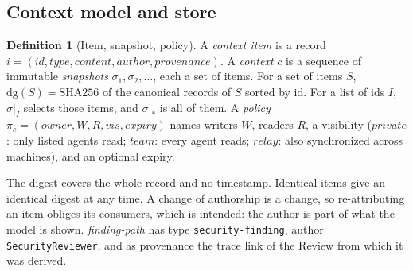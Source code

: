 \documentclass[10pt,conference]{IEEEtran}
\theoremstyle{definition}
\newtheorem{definition}{Definition}
\newcommand{\cls}[1]{\textsf{#1}}
\newcommand{\code}[1]{\texttt{#1}}
\newcommand{\dig}{\mathrm{dg}}
\begin{document}
\subsection{Context model and store}\label{sec:store}

\begin{definition}[Item, snapshot, policy]\label{def:context}
A \emph{context item} is a record $i=(\mathit{id},\mathit{type},\mathit{content},\mathit{author},
\mathit{provenance})$. A \emph{context} $c$ is a sequence of immutable \emph{snapshots}
$\sigma_1,\sigma_2,\dots$, each a set of items. For a set of items $S$,
$\dig(S)=\mathrm{SHA256}$ of the canonical records of $S$ sorted by id. For a list of ids $I$, $\sigma|_I$
selects those items, and $\sigma|_{*}$ is all of them. A \emph{policy} $\pi_c=(\mathit{owner},W,R,
\mathit{vis},\mathit{expiry})$ names writers $W$, readers $R$, a visibility ($\mathit{private}$: only listed
agents read; $\mathit{team}$: every agent reads; $\mathit{relay}$: also synchronized across machines), and an
optional expiry.
\end{definition}

The digest covers the whole record and no timestamp. Identical items give an identical digest at any time.
A change of authorship is a change, so re-attributing an item obliges its consumers, which is intended: the
author is part of what the model is shown. \emph{finding-path} has type \code{security-finding}, author
\code{SecurityReviewer}, and as provenance the trace link of the \cls{Review} from which it was derived.
\end{document}
